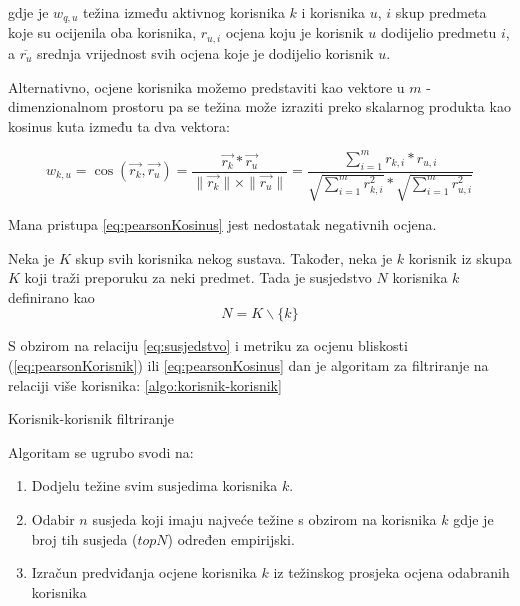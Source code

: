 \documentclass[times, utf8, diplomski, numeric]{fer}
\begin{document}
gdje je $w_{q,u}$ težina između aktivnog korisnika $k$ i korisnika $u$, $i$ skup
predmeta koje su ocijenila oba korisnika, $r_{u,i}$ ocjena koju je korisnik $u$
dodijelio predmetu $i$, a $\overline{r_u}$ srednja vrijednost svih ocjena koje
je dodijelio korisnik $u$.

Alternativno, ocjene korisnika možemo predstaviti kao vektore u
$m$ - dimenzionalnom prostoru pa se težina može izraziti preko skalarnog
produkta kao kosinus kuta između ta dva vektora:

\begin{equation}
\label{eq:pearsonKosinus}
	w_{k,u} = 
		\cos{(\vec{r_k}, \vec{r_u})} = 
		\frac
			{\vec{r_k} \ast \vec{r_u}}
			{\|\vec{r_k}\| \times \|\vec{r_u}\|} = 
		\frac
			{\sum_{i=1}^m r_{k,i} \ast r_{u,i}}
			{\sqrt{\sum_{i=1}^m r_{k,i}^2} \ast \sqrt{\sum_{i=1}^m r_{u,i}^2}}
\end{equation}

Mana pristupa \ref{eq:pearsonKosinus} jest nedostatak negativnih ocjena.

Neka je $K$ skup svih korisnika nekog sustava. Također, neka je $k$ korisnik iz
skupa $K$ koji traži preporuku za neki predmet. Tada je susjedstvo $N$
korisnika $k$ definirano kao
\begin{equation}
\label{eq:susjedstvo}
	N = K \backslash \{k\}
\end{equation}

S obzirom na relaciju \ref{eq:susjedstvo} i metriku za ocjenu bliskosti
(\ref{eq:pearsonKorisnik}) ili \ref{eq:pearsonKosinus} dan je algoritam za
filtriranje na relaciji više korisnika:
\ref{algo:korisnik-korisnik}
\begin{algorithm}
	\caption{Korisnik-korisnik filtriranje}
	\label{algo:korisnik-korisnik}
	\begin{algorithmic}
		\ENDFOR
		\ENDFOR
	\end{algorithmic}
\end{algorithm}

Algoritam se ugrubo svodi na:
\begin{enumerate}
  \item Dodjelu težine svim susjedima korisnika $k$.
  \item Odabir $n$ susjeda koji imaju najveće težine s obzirom na korisnika $k$
  gdje je broj tih susjeda ($topN$) određen empirijski.
  \item Izračun predviđanja ocjene korisnika $k$ iz težinskog prosjeka ocjena
  odabranih korisnika
\end{enumerate}
\end{document}
